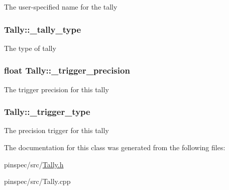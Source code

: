 The user-\/specified name for the tally \hypertarget{classTally_afbacc20607dc0b3fd997d9f18da454ac}{
\subsubsection[{\-\_\-tally\-\_\-type}]{ Tally\-::\-\_\-tally\-\_\-type\hspace{0.3cm}{\ttfamily [protected]}}}\label{classTally_afbacc20607dc0b3fd997d9f18da454ac}
The type of tally \hypertarget{classTally_a3c0580f9c5687a77514c9befa61bb22a}{
\subsubsection[{\-\_\-trigger\-\_\-precision}]{\setlength{\rightskip}{0pt plus 5cm}float Tally\-::\-\_\-trigger\-\_\-precision\hspace{0.3cm}{\ttfamily [protected]}}}\label{classTally_a3c0580f9c5687a77514c9befa61bb22a}
The trigger precision for this tally \hypertarget{classTally_a93e93ae8e943327d04e4a041c7f4de8c}{
\subsubsection[{\-\_\-trigger\-\_\-type}]{ Tally\-::\-\_\-trigger\-\_\-type\hspace{0.3cm}{\ttfamily [protected]}}}\label{classTally_a93e93ae8e943327d04e4a041c7f4de8c}
The precision trigger for this tally 

The documentation for this class was generated from the following files\-:\begin{DoxyCompactItemize}
\item 
pinspec/src/\hyperlink{Tally_8h}{Tally.\-h}\item 
pinspec/src/Tally.\-cpp\end{DoxyCompactItemize}

